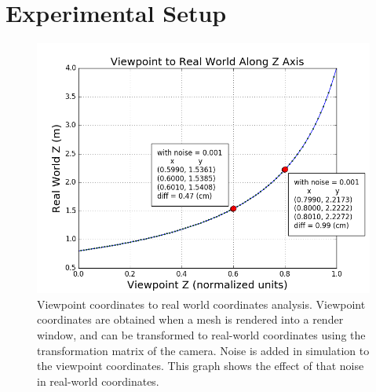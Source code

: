 \section{Experimental Setup}	\label{sec:related_works}

\begin{figure}[h]%
\centering
\includegraphics[width=.5\textwidth]{figures/plot_depth.png}
\caption{Viewpoint coordinates to real world coordinates analysis. Viewpoint coordinates are obtained when a mesh is rendered into a render window, and can be transformed to real-world coordinates using the transformation matrix of the camera. Noise is added in simulation to the viewpoint coordinates. This graph shows the effect of that noise in real-world coordinates.}
\label{fig:depth}
\end{figure}
